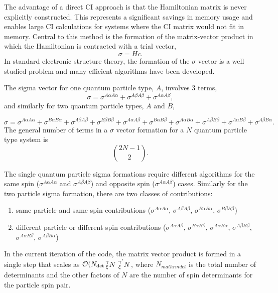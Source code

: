 The advantage of a direct CI approach is that the Hamiltonian matrix is never explicitly constructed.
This represents a significant savings in memory usage and enables large CI calculations for systems where the CI matrix would not fit in memory. Central to this method is the formation of the matrix-vector product in which the Hamiltonian is contracted with a trial vector,
\begin{equation}
    \sigma = H c.
\end{equation}
In standard electronic structure theory, the formation of the $\sigma$ vector is a well studied problem and many efficient algorithms have been developed.

The sigma vector for one quantum particle type, $A$, involves 3 terms,
\begin{equation}
    \sigma = 
    \sigma^{A \alpha A \alpha} +
    \sigma^{A \beta A \beta} +
    \sigma^{A \alpha A \beta},
\end{equation}
and similarly for two quantum particle types, $A$ and $B$, 

\begin{equation}
    \sigma = 
    \sigma^{A \alpha A \alpha} +
    \sigma^{B \alpha B \alpha} +
    \sigma^{A \beta A \beta} +
    \sigma^{B \beta B \beta} +
    \sigma^{A \alpha A \beta} +
    \sigma^{B \alpha B \beta} +
    \sigma^{A \alpha B \alpha} +
    \sigma^{A \beta B \beta} +
    \sigma^{A \alpha B \beta} +
    \sigma^{A \beta B \alpha}.
\end{equation}
The general number of terms in a $\sigma$ vector formation for a $N$ quantum particle type system is 
\begin{equation}
    \binom{2N -1}{2}.
\end{equation}

The single quantum particle sigma formations require different algorithms for the same spin ($\sigma^{A\alpha A\alpha}$ and $\sigma^{A\beta A\beta}$) and opposite spin ($\sigma^{A\alpha A\beta}$) cases.
Similarly for the two particle sigma formation, there are two classes of contributions:
\begin{enumerate}
    \item same particle and same spin contributions ($\sigma^{A\alpha A\alpha}$, $\sigma^{A\beta A\beta}$, $\sigma^{B\alpha B\alpha}$, $\sigma^{B\beta B\beta}$)
    \item different particle or different spin contributions ($\sigma^{A\alpha A\beta}$, $\sigma^{B\alpha B\beta}$, $\sigma^{A\alpha B\alpha}$, $\sigma^{A\beta B\beta}$, $\sigma^{A\alpha B\beta}$, $\sigma^{A\beta B\alpha}$)
\end{enumerate}
In the current iteration of the code, the matrix vector product is formed in a single step that scales as $\mathcal{O}(N_{\mathrm{det}}\sideset{^{\gamma}_{\xi}}{^{}_{}}{\mathop{N}} \sideset{^{\gamma'}_{\xi}}{^{}_{}}{\mathop{N}}$, where $N_{mathrm{det}}$ is the total number of determinants and the other factors of $N$ are the number of spin determinants for the particle spin pair.

